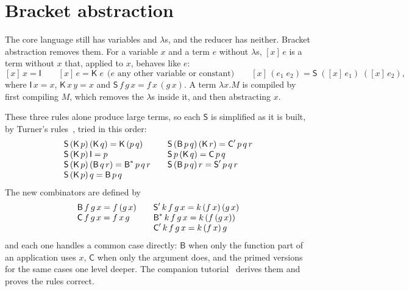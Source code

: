\documentclass[11pt,a4paper]{article}
\newcommand{\cmb}[1]{\textsf{#1}}
\newcommand{\I}{\cmb{I}}
\newcommand{\K}{\cmb{K}}
\newcommand{\Sc}{\cmb{S}}
\newcommand{\B}{\cmb{B}}
\newcommand{\C}{\cmb{C}}
\newcommand{\Sp}{\cmb{S}'}
\newcommand{\Bs}{\cmb{B}^{*}}
\newcommand{\Cp}{\cmb{C}'}
\newcommand{\abs}[2]{[#1]\,#2}
\theoremstyle{definition}
\theoremstyle{plain}
\begin{document}
\section{Bracket abstraction}\label{sec:abstraction}

The core language still has variables and $\lambda$s, and the reducer has
neither. Bracket abstraction removes them. For a variable $x$ and a term $e$
without $\lambda$s, $\abs{x}{e}$ is a term without $x$ that, applied to $x$,
behaves like $e$:
\[
  \abs{x}{x} = \I \qquad
  \abs{x}{e} = \K\;e \ \ \text{($e$ any other variable or constant)} \qquad
  \abs{x}{(e_1\;e_2)} = \Sc\;(\abs{x}{e_1})\;(\abs{x}{e_2}),
\]
where $\I\,x = x$, $\K\,x\,y = x$ and $\Sc\,f\,g\,x = f\,x\,(g\,x)$. A term
$\lambda x.M$ is compiled by first compiling $M$, which removes the
$\lambda$s inside it, and then abstracting $x$.

These three rules alone produce large terms, so each $\Sc$ is simplified as it
is built, by Turner's rules~\cite{turner79}, tried in this order:
\[
\begin{array}{@{}l@{\qquad}l@{}}
\Sc\,(\K\,p)\,(\K\,q) = \K\,(p\,q) & \Sc\,(\B\,p\,q)\,(\K\,r) = \Cp\,p\,q\,r\\
\Sc\,(\K\,p)\,\I = p & \Sc\,p\,(\K\,q) = \C\,p\,q\\
\Sc\,(\K\,p)\,(\B\,q\,r) = \Bs\,p\,q\,r & \Sc\,(\B\,p\,q)\,r = \Sp\,p\,q\,r\\
\Sc\,(\K\,p)\,q = \B\,p\,q &
\end{array}
\]
The new combinators are defined by
\[
\begin{array}{@{}l@{\qquad}l@{}}
\B\,f\,g\,x = f\,(g\,x) & \Sp\,k\,f\,g\,x = k\,(f\,x)\,(g\,x)\\
\C\,f\,g\,x = f\,x\,g & \Bs\,k\,f\,g\,x = k\,(f\,(g\,x))\\
 & \Cp\,k\,f\,g\,x = k\,(f\,x)\,g
\end{array}
\]
and each one handles a common case directly: $\B$ when only the function
part of an application uses $x$, $\C$ when only the argument does, and the
primed versions for the same cases one level deeper. The companion
tutorial~\cite{graphtut} derives them and proves the rules correct.
\end{document}
